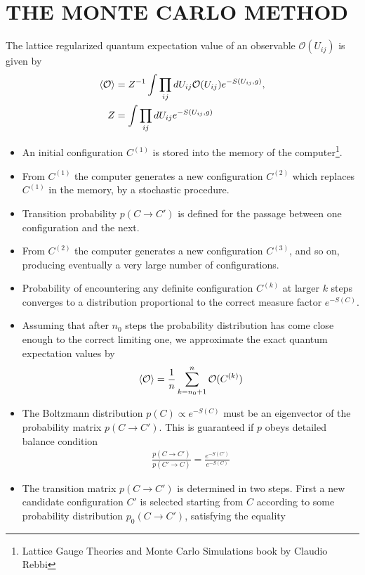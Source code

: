 \documentclass[]{article}
\numberwithin{equation}{section}
\begin{document}
\section{THE MONTE CARLO METHOD} 
The lattice regularized quantum expectation value of an observable $\mathcal{O}(U_{ij})$ is given by
\begin{align}
    \braket{\mathcal{O}}&=Z^{-1}\int \prod_{ij}dU_{ij}\mathcal{O}(U_{ij})e^{-S(U_{ij},g)},\\
    Z&=\int \prod_{ij}dU_{ij}e^{-S(U_{ij},g)}
\end{align}
\begin{itemize}
    \item  An initial configuration $C^{(1)}$ is stored into the memory of the computer\footnote{Lattice Gauge Theories and Monte Carlo Simulations book by Claudio Rebbi }.        
    \item From $C^{(1)}$ the computer generates a new configuration $C^{(2)}$ which replaces $C^{(1)}$ in the memory, by a stochastic procedure.
    \item Transition probability $p(C\longrightarrow C')$ is defined for the passage between one configuration and the next. 
    \item From $C^{(2)}$ the computer generates a new configuration $C^{(3)}$, and so on, producing eventually a very large number of configurations. 
    \item Probability of encountering any definite configuration $C^(k)$ at larger $k$ steps converges to a distribution proportional to the correct measure factor $e^{-S(C)}$.
    \item Assuming that after $n_0$ steps the probability distribution has come close enough to the correct limiting one, we approximate the exact quantum expectation values by
    \begin{align}
        \braket{\mathcal{O}}=\frac{1}{n}\sum_{k=n_0+1}^{n}\mathcal{O}(C^{(k)})
    \end{align}
    \item The Boltzmann distribution $p(C) \propto e^{-S(C)}$ must be an eigenvector of the probability matrix $p(C \longrightarrow C')$. This is guaranteed if $p$ obeys detailed balance condition 
    \begin{align}
        \frac{p(C\longrightarrow C')}{p(C'\longrightarrow C)}=\frac{e^{-S(C')}}{e^{-S(C)}}
    \end{align}
    \item The transition matrix $p(C \longrightarrow C')$ is determined in two steps. First a new candidate configuration $C'$ is selected starting from $C$ according to some probability distribution $p_0(C\longrightarrow C')$, satisfying the equality 

\end{itemize}
\end{document}
